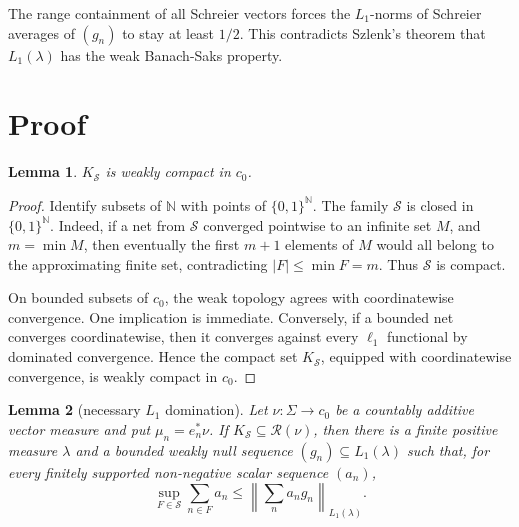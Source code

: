 \documentclass[11pt]{article}
\newtheorem{lemma}{Lemma}
\newcommand{\N}{\mathbb N}
\newcommand{\Sch}{\mathcal S}
\newcommand{\Range}{\mathcal R}
\begin{document}
The range containment of all Schreier vectors forces the \(L_1\)-norms of
Schreier averages of \((g_n)\) to stay at least \(1/2\). This contradicts
Szlenk's theorem that \(L_1(\lambda)\) has the weak Banach-Saks property.

\section*{Proof}

\begin{lemma}
\(K_{\Sch}\) is weakly compact in \(c_0\).
\end{lemma}

\begin{proof}
Identify subsets of \(\N\) with points of \(\{0,1\}^{\N}\). The family
\(\Sch\) is closed in \(\{0,1\}^{\N}\). Indeed, if a net from \(\Sch\)
converged pointwise to an infinite set \(M\), and \(m=\min M\), then eventually
the first \(m+1\) elements of \(M\) would all belong to the approximating
finite set, contradicting \(|F|\le \min F=m\). Thus \(\Sch\) is compact.

On bounded subsets of \(c_0\), the weak topology agrees with coordinatewise
convergence. One implication is immediate. Conversely, if a bounded net
converges coordinatewise, then it converges against every \(\ell_1\) functional
by dominated convergence. Hence the compact set \(K_{\Sch}\), equipped with
coordinatewise convergence, is weakly compact in \(c_0\).
\end{proof}

\begin{lemma}[necessary \(L_1\) domination]
Let \(\nu:\Sigma\to c_0\) be a countably additive vector measure and put
\(\mu_n=e_n^*\nu\). If \(K_{\Sch}\subseteq\Range(\nu)\), then there is a
finite positive measure \(\lambda\) and a bounded weakly null sequence
\((g_n)\subseteq L_1(\lambda)\) such that, for every finitely supported
non-negative scalar sequence \((a_n)\),
\[
\sup_{F\in\Sch}\sum_{n\in F} a_n
\le
\left\|\sum_n a_n g_n\right\|_{L_1(\lambda)}.
\]
\end{lemma}
\end{document}
